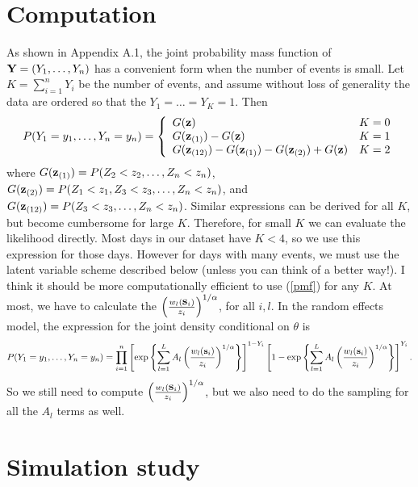 \documentclass[11pt]{article}
\newcommand{\bY}{ \mbox{\bf Y}}
\newcommand{\bz}{ \mbox{\bf z}}
\newcommand{\bs}{ \mbox{\bf s}}
\newcommand{\beq}{ \begin{equation}}
\newcommand{\eeq}{ \end{equation}}
\begin{document}
\section{Computation}\label{s:comp}

As shown in Appendix A.1, the joint probability mass function of $\bY=(Y_1,\ldots,Y_n)$ has a convenient form when the number of events is small.  Let $K=\sum_{i=1}^nY_i$ be the number of events, and assume without loss of generality the data are ordered so that the $Y_1=\ldots=Y_K=1$.  Then
\beq\label{pmf}
   P(Y_1=y_1,\ldots,Y_n=y_n) =  \left\{
                               \begin{array}{ll}
                                 G(\bz) & K=0 \\
                                 G(\bz_{(1)})-G(\bz) & K=1 \\
                                 G(\bz_{(12)})-G(\bz_{(1)})-G(\bz_{(2)})+G(\bz) & K=2
                               \end{array}
                             \right.
\eeq
where $G(\bz_{(1)}) = P(Z_2<z_2,\ldots,Z_n<z_n)$, $G(\bz_{(2)}) = P(Z_1<z_1,Z_3<z_3,\ldots,Z_n<z_n)$, and $G(\bz_{(12)}) = P(Z_3<z_3,\ldots,Z_n<z_n)$.  Similar expressions can be derived for all $K$, but become cumbersome for large $K$.  Therefore, for small $K$ we can evaluate the likelihood directly.  Most days in our dataset have $K<4$, so we use this expression for those days.  However for days with many events, we must use the latent variable scheme described below (unless you can think of a better way!).
I think it should be more computationally efficient to use (\ref{pmf}) for any $K$. At most, we have to calculate the $\left( \frac{ w_{l}(\bs_i) }{ z_i } \right)^{1/\alpha}$, for all $i, l$. In the random effects model, the expression for the joint density conditional on $\theta$ is 
\beq
	P(Y_1=y_1,\ldots,Y_n=y_n) = \prod_{ i = 1 }^{ n } \left[ \exp \left\{ \sum_{ l = 1 }^{L} A_l \left( \frac{ w_{l}(\bs_i) }{ z_i } \right)^{ 1/\alpha} \right\} \right]^{ 1 - Y_i } \left[ 1 - \exp \left\{ \sum_{ l = 1 }^{L} A_l \left( \frac{ w_{l}(\bs_i) }{ z_i } \right)^{ 1/\alpha} \right\} \right]^{ Y_i }.
\eeq
So we still need to compute $\left( \frac{ w_{l}(\bs_i) }{ z_i } \right)^{1/\alpha}$, but we also need to do the sampling for all the $A_l$ terms as well.

\section{Simulation study}\label{s:sim}
\end{document}
